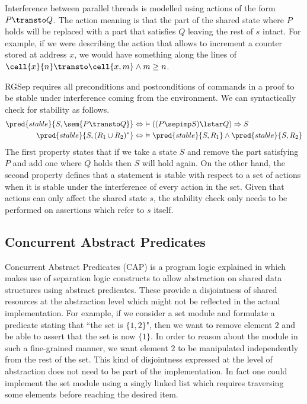 Interference between parallel threads is modelled using actions of the form $P \transto Q$. The action meaning is that the part of the shared state where $P$ holds will be replaced with a part that satisfies $Q$ leaving the rest of $s$ intact. For example, if we were describing the action that allows to increment a counter stored at address $x$, we would have something along the lines of $\cell{x}{n} \transto \cell{x, m} \land m \geq n$.

RGSep requires all preconditions and postconditions of commands in a proof to be stable under interference coming from the environment. We can syntactically check for stability as follows.
\begin{align*}
\pred{stable}{S, \sem{P \transto Q}} &\Leftrightarrow\ \vDash ((P \sepimp S) \lstar Q) \Rightarrow S
\\
\pred{stable}{S, (R_1 \cup R_2)^*} &\Leftrightarrow\ \vDash \pred{stable}{S, R_1} \land \pred{stable}{S, R_2}
\end{align*}
The first property states that if we take a state $S$ and remove the part satisfying $P$ and add one where $Q$ holds then $S$ will hold again. On the other hand, the second property defines that a statement is stable with respect to a set of actions when it is stable under the interference of every action in the set. Given that actions can only affect the shared state $s$, the stability check only needs to be performed on assertions which refer to $s$ itself. \\

\tocless\subsection{Concurrent Abstract Predicates}

\label{sec:cap}

Concurrent Abstract Predicates (CAP) is a program logic explained in \cite{cap} which makes use of separation logic constructs to allow abstraction on shared data structures using abstract predicates. These provide a disjointness of shared resources at the abstraction level which might not be reflected in the actual implementation. For example, if we consider a set module and formulate a predicate stating that ``the set is $\{ 1,2 \}$", then we want to remove element $2$ and be able to assert that the set is now $\{ 1 \}$. In order to reason about the module in such a fine-grained manner, we want element $2$ to be manipulated independently from the rest of the set. This kind of disjointness expressed at the level of abstraction does not need to be part of the implementation. In fact one could implement the set module using a singly linked list which requires traversing some elements before reaching the desired item.

